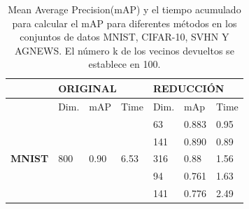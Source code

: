 \begin{table}[!h]
\centering
\caption{Mean Average Precision(mAP) y el tiempo acumulado para calcular el mAP para diferentes métodos en los conjuntos de datos MNIST, CIFAR-10, SVHN Y AGNEWS. El número k de los vecinos devueltos se establece en 100.}
\label{table:section4_origin_reduction}
\begin{tabular}{l|l|l|l|l|l|l|}
\cline{2-7}
                                                                                 & \multicolumn{3}{l|}{\cellcolor[HTML]{EFEFEF}ORIGINAL}                                                                                              & \multicolumn{3}{l|}{\cellcolor[HTML]{EFEFEF}REDUCCIÓN} \\ \hline
\rowcolor[HTML]{EFEFEF} 
\multicolumn{1}{|l|}{\cellcolor[HTML]{EFEFEF}}                                   & Dim.                                           & mAP                                             & Time                                            & {Dim.}     & {mAp}    & {Time}    \\ \hline
\multicolumn{1}{|l|}{}                                                           &                                                &                                                 &                                                 & 63                & 0.883           & 0.95             \\ \cline{5-7} 
\multicolumn{1}{|l|}{}                                                           &                                                &                                                 &                                                 & 141               & 0.890           & 0.89             \\ \cline{5-7} 
\multicolumn{1}{|l|}{\multirow{-3}{*}{\textbf{MNIST}}}                           & \multirow{-3}{*}{800}                          & \multirow{-3}{*}{0.90}                          & \multirow{-3}{*}{6.53}                          & 316               & 0.88            & 1.56             \\ \hline
\rowcolor[HTML]{EFEFEF} 
\multicolumn{1}{|l|}{\cellcolor[HTML]{EFEFEF}}                                   & \cellcolor[HTML]{EFEFEF}                       & \cellcolor[HTML]{EFEFEF}                        & \cellcolor[HTML]{EFEFEF}                        & 94                & 0.761           & 1.63             \\ \cline{5-7} 
\rowcolor[HTML]{EFEFEF} 
\multicolumn{1}{|l|}{\cellcolor[HTML]{EFEFEF}}                                   & \cellcolor[HTML]{EFEFEF}                       & \cellcolor[HTML]{EFEFEF}                        & \cellcolor[HTML]{EFEFEF}                        & 141               & 0.776           & 2.49            \\ \cline{5-7} 

\end{tabular}
\end{table}
